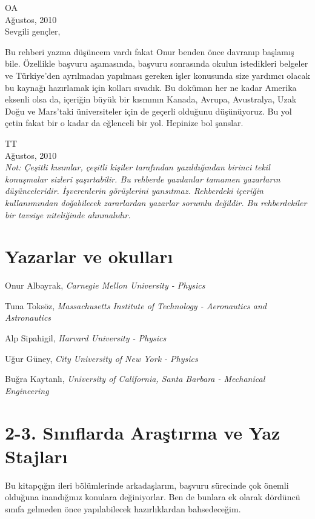 \documentclass[12pt]{article}
\begin{document}
\noindent OA \\
Ağustos, 2010 \\

\noindent Sevgili gençler, 

Bu rehberi yazma düşüncem vardı fakat Onur benden önce davranıp başlamış bile. Özellikle başvuru aşamasında, başvuru sonrasında okulun istedikleri belgeler ve Türkiye'den ayrılmadan yapılması gereken işler konusunda size yardımcı olacak bu kaynağı hazırlamak için kolları sıvadık. Bu doküman her ne kadar Amerika eksenli olsa da, içeriğin büyük bir kısmının Kanada, Avrupa, Avustralya, Uzak Doğu ve Mars'taki üniversiteler için de geçerli olduğunu düşünüyoruz. Bu yol çetin fakat bir o kadar da eğlenceli bir yol. Hepinize bol şanslar.   

\noindent TT \\
Ağustos, 2010 \\

\textit{Not: Çeşitli kısımlar, çeşitli kişiler tarafından yazıldığından birinci tekil konuşmalar sizleri şaşırtabilir. Bu rehberde yazılanlar tamamen yazarların düşünce\-leridir. İşverenlerin görüşlerini yansıtmaz. Rehberdeki içeriğin kullanımından doğabilecek zararlardan yazarlar sorumlu değildir. Bu rehberdekiler bir tavsiye niteliğinde alınmalıdır.}

\newpage
%
%
%
\section*{Yazarlar ve okulları}

Onur Albayrak, \textit{Carnegie Mellon University - Physics }

Tuna Toksöz, \textit{Massachusetts Institute of Technology - Aeronautics and \\ Astronautics }

Alp Sipahigil, \textit{Harvard University - Physics }

Uğur Güney, \textit{City University of New York - Physics }

Buğra Kaytanlı, \textit{University of California, Santa Barbara - Mechanical \\ Engineering}
\newpage
%
%
\section{2-3. Sınıflarda Araştırma ve Yaz Stajları}
Bu kitapçığın ileri bölümlerinde arkadaşlarım, başvuru sürecinde çok önemli olduğuna inandığmız konulara değiniyorlar. Ben de bunlara ek olarak dördün\-cü sınıfa gelmeden önce yapılabilecek hazırlıklardan bahsedeceğim.
\end{document}

